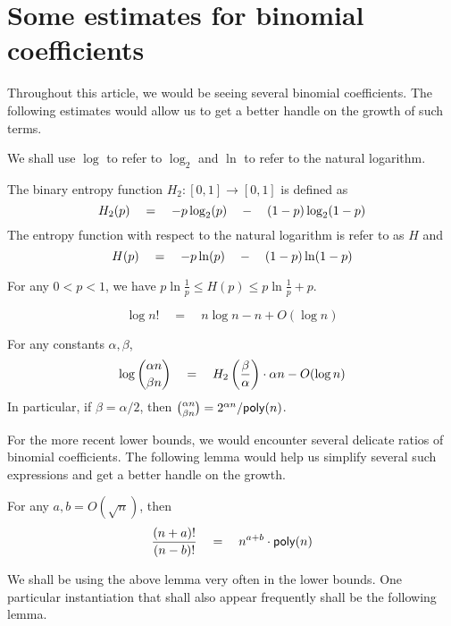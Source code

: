 \chapter{Some estimates for binomial coefficients}

Throughout this article, we would be seeing several binomial coefficients. The following estimates would allow us to get a better handle on the growth of such terms. 

We shall use $\log$ to refer to $\log_2$ and $\ln$ to refer to the natural logarithm. 


\begin{definition}\label{def:entropy}
The binary entropy function $H_2:[0,1]\rightarrow [0,1]$ is defined as
\[
H_2(p) \quad = \quad - p \log_2(p) \quad - \quad (1-p) \log_2(1-p)
\]
The entropy function with respect to the natural logarithm is refer to as $H$ and
\[
H(p) \quad = \quad - p \ln(p) \quad - \quad (1-p) \ln(1-p)
\]
\end{definition}

\begin{proposition}\label{prop:entropy-estimate}
For any $0< p  < 1$, we have $p\ln\frac{1}{p} \leq H(p) \leq p\ln\frac{1}{p} + p$. 
\end{proposition}

\begin{proposition}\label{prop:sterling}
\[
\log n! \quad=\quad n\log n - n + O(\log n)
\]
\end{proposition}

\begin{proposition}
For any constants $\alpha, \beta$, 
\[
\log\binom{\alpha n}{\beta n} \quad = \quad H_2\left(\frac{\beta}{\alpha}\right) \cdot \alpha n - O(\log n)
\]
In particular, if $\beta = \alpha/2$, then $\binom{\alpha n}{\beta{n}} = 2^{\alpha n} / \mathsf{poly}(n)$. 
\end{proposition}

For the more recent lower bounds, we would encounter several delicate ratios of binomial coefficients. The following lemma would help us simplify several such expressions and get a better handle on the growth. 

\begin{lemma}{\cite[Lemma 6]{gkks13}}\label{lem:factorial-ratio} For any $a,b = O(\sqrt{n})$, then
\[
\frac{(n+a)!}{(n-b)!}\quad=\quad n^{a + b} \cdot \mathsf{poly}(n)
\]
\end{lemma}

We shall be using the above lemma very often in the lower bounds. One particular instantiation that shall also appear frequently shall be the following lemma.  

